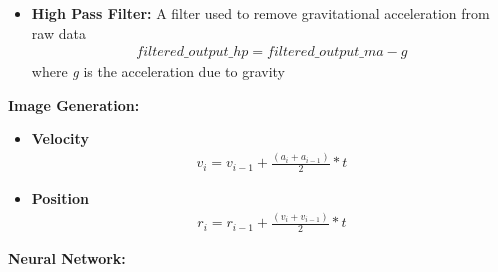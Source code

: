 \documentclass[a4paper, oneside,11pt]{article}
\begin{document}
\begin{itemize}
	\item \textbf{High Pass Filter:}
		A filter used to remove gravitational acceleration from raw data 
		\begin{eqnarray}
		  filtered\_output\_hp = filtered\_output\_ma - \textit{g}
		\end{eqnarray}
		where \textit{g} is the acceleration due to gravity
\end{itemize}

\textbf{Image Generation:}

\begin{itemize}
	\item \textbf{Velocity}
		\begin{eqnarray}
		  v_i = v_{i-1} + \frac{(a_i + a_{i-1})}{2}*t
		\end{eqnarray}

	\item \textbf{Position}
		\begin{eqnarray}
		  r_i = r_{i-1} + \frac{(v_i + v_{i-1})}{2}*t
		\end{eqnarray}
\end{itemize}

\textbf{Neural Network:}
\end{document}

